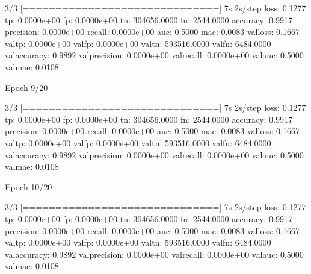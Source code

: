 \documentclass[letterpaper,10pt,english]{sphinxmanual}
\begin{document}
\begin{sphinxVerbatim}[commandchars=\\\{\}]
3/3 [==============================] \PYGZhy{} 7s 2s/step \PYGZhy{} loss: 0.1277 \PYGZhy{} tp: 0.0000e+00 \PYGZhy{} fp: 0.0000e+00 \PYGZhy{} tn: 304656.0000 \PYGZhy{} fn: 2544.0000 \PYGZhy{} accuracy: 0.9917 \PYGZhy{} precision: 0.0000e+00 \PYGZhy{} recall: 0.0000e+00 \PYGZhy{} auc: 0.5000 \PYGZhy{} mae: 0.0083 \PYGZhy{} val\PYGZus{}loss: 0.1667 \PYGZhy{} val\PYGZus{}tp: 0.0000e+00 \PYGZhy{} val\PYGZus{}fp: 0.0000e+00 \PYGZhy{} val\PYGZus{}tn: 593516.0000 \PYGZhy{} val\PYGZus{}fn: 6484.0000 \PYGZhy{} val\PYGZus{}accuracy: 0.9892 \PYGZhy{} val\PYGZus{}precision: 0.0000e+00 \PYGZhy{} val\PYGZus{}recall: 0.0000e+00 \PYGZhy{} val\PYGZus{}auc: 0.5000 \PYGZhy{} val\PYGZus{}mae: 0.0108
\end{sphinxVerbatim}

\begin{sphinxVerbatim}[commandchars=\\\{\}]
Epoch 9/20
\end{sphinxVerbatim}

\begin{sphinxVerbatim}[commandchars=\\\{\}]
3/3 [==============================] \PYGZhy{} 7s 2s/step \PYGZhy{} loss: 0.1277 \PYGZhy{} tp: 0.0000e+00 \PYGZhy{} fp: 0.0000e+00 \PYGZhy{} tn: 304656.0000 \PYGZhy{} fn: 2544.0000 \PYGZhy{} accuracy: 0.9917 \PYGZhy{} precision: 0.0000e+00 \PYGZhy{} recall: 0.0000e+00 \PYGZhy{} auc: 0.5000 \PYGZhy{} mae: 0.0083 \PYGZhy{} val\PYGZus{}loss: 0.1667 \PYGZhy{} val\PYGZus{}tp: 0.0000e+00 \PYGZhy{} val\PYGZus{}fp: 0.0000e+00 \PYGZhy{} val\PYGZus{}tn: 593516.0000 \PYGZhy{} val\PYGZus{}fn: 6484.0000 \PYGZhy{} val\PYGZus{}accuracy: 0.9892 \PYGZhy{} val\PYGZus{}precision: 0.0000e+00 \PYGZhy{} val\PYGZus{}recall: 0.0000e+00 \PYGZhy{} val\PYGZus{}auc: 0.5000 \PYGZhy{} val\PYGZus{}mae: 0.0108
\end{sphinxVerbatim}

\begin{sphinxVerbatim}[commandchars=\\\{\}]
Epoch 10/20
\end{sphinxVerbatim}

\begin{sphinxVerbatim}[commandchars=\\\{\}]
3/3 [==============================] \PYGZhy{} 7s 2s/step \PYGZhy{} loss: 0.1277 \PYGZhy{} tp: 0.0000e+00 \PYGZhy{} fp: 0.0000e+00 \PYGZhy{} tn: 304656.0000 \PYGZhy{} fn: 2544.0000 \PYGZhy{} accuracy: 0.9917 \PYGZhy{} precision: 0.0000e+00 \PYGZhy{} recall: 0.0000e+00 \PYGZhy{} auc: 0.5000 \PYGZhy{} mae: 0.0083 \PYGZhy{} val\PYGZus{}loss: 0.1667 \PYGZhy{} val\PYGZus{}tp: 0.0000e+00 \PYGZhy{} val\PYGZus{}fp: 0.0000e+00 \PYGZhy{} val\PYGZus{}tn: 593516.0000 \PYGZhy{} val\PYGZus{}fn: 6484.0000 \PYGZhy{} val\PYGZus{}accuracy: 0.9892 \PYGZhy{} val\PYGZus{}precision: 0.0000e+00 \PYGZhy{} val\PYGZus{}recall: 0.0000e+00 \PYGZhy{} val\PYGZus{}auc: 0.5000 \PYGZhy{} val\PYGZus{}mae: 0.0108
\end{sphinxVerbatim}
\end{document}
